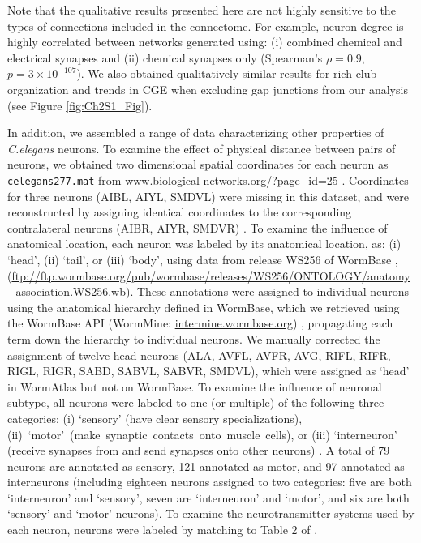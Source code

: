 Note that the qualitative results presented here are not highly sensitive to the types of connections included in the connectome.
For example, neuron degree is highly correlated between networks generated using: (i) combined chemical and electrical synapses and (ii) chemical synapses only (Spearman's $\rho= 0.9$, $p = 3 \times 10^{-107}$).
We also obtained qualitatively similar results for rich-club organization and trends in CGE when excluding gap junctions from our analysis (see Figure \ref{fig:Ch2S1_Fig}).

In addition, we assembled a range of data characterizing other properties of \emph{C.elegans} neurons.
To examine the effect of physical distance between pairs of neurons, we obtained two dimensional spatial coordinates for each neuron as \texttt{celegans277.mat} from \url{www.biological-networks.org/?page_id=25} \citep{Choe2004}.
Coordinates for three neurons (AIBL, AIYL, SMDVL) were missing in this dataset, and were reconstructed by assigning identical coordinates to the corresponding contralateral neurons (AIBR, AIYR, SMDVR) \citep{Varier2011}.
To examine the influence of anatomical location, each neuron was labeled by its anatomical location, as:
(i) `head', (ii) `tail', or (iii) `body', using data from release WS256 of WormBase \citep{Harris2010}, (\url{ftp://ftp.wormbase.org/pub/wormbase/releases/WS256/ONTOLOGY/anatomy_association.WS256.wb}).
These annotations were assigned to individual neurons using the anatomical hierarchy defined in WormBase, which we retrieved using the WormBase API (WormMine: \url{intermine.wormbase.org}) \citep{Harris2010}, propagating each term down the hierarchy to individual neurons.
We manually corrected the assignment of twelve head neurons (ALA, AVFL, AVFR, AVG, RIFL, RIFR, RIGL, RIGR, SABD, SABVL, SABVR, SMDVL), which were assigned as `head' in WormAtlas \citep{WormAtlas} but not on WormBase.
To examine the influence of neuronal subtype, all neurons were labeled to one (or multiple) of the following three categories:
(i) `sensory' (have clear sensory specializations),
\mbox{(ii) `motor' (make synaptic contacts onto muscle cells)}, or
(iii) `interneuron' (receive synapses from and send synapses onto other neurons) \citep{White1986}.
A total of 79 neurons are annotated as sensory, 121 annotated as motor, and 97 annotated as interneurons (including eighteen neurons assigned to two categories: five are both `interneuron' and `sensory', seven are `interneuron' and `motor', and six are both `sensory' and `motor' neurons).
To examine the neurotransmitter systems used by each neuron, neurons were labeled by matching to Table 2 of \citet{Pereira2015}.

